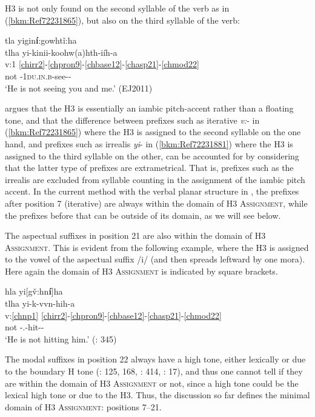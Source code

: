\documentclass[output=paper]{langscibook}
\begin{document}
H3 is not only found on the second syllable of the verb as in (\ref{bkm:Ref72231865}), but also on the third syllable of the verb:

\ea\label{bkm:Ref72231881}tla yigin\textbf{í}:gowhtǐ:ha \\
\glll tlha yi-kinii-koohw(a)hth-iíh-a\\
v:1 \ref{chirr2}-\ref{chpron9}-\ref{chbase12}-\ref{chasp21}-\ref{chmod22}\\ 
not \Irr{}-\textsc{1du.in.b}-see-\Prs{}-\Ind{}\\
\glt `He is not seeing you and me.' (EJ2011)\\
\z 
     
\citet[ch.10]{uchihara2016tone} argues that the H3 is essentially an iambic pitch-accent rather than a floating tone, and that the difference between prefixes such as iterative \textit{v:}{}- in (\ref{bkm:Ref72231865}) where the H3 is assigned to the second syllable on the one hand, and prefixes such as irrealis \textit{yi}{}- in (\ref{bkm:Ref72231881}) where the H3 is assigned to the third syllable on the other, can be accounted for by considering that the latter type of prefixes are extrametrical. That is, prefixes such as the irrealis are excluded from syllable counting in the assignment of the iambic pitch accent. In the current method with the verbal planar structure in , the prefixes after position 7 (iterative) are always within the domain of H3 \textsc{Assignment}, while the prefixes before that can be outside of its domain, as we will see below.

The aspectual suffixes in position 21 are also within the domain of H3 \textsc{Assignment}. This is evident from the following example, where the H3 is assigned to the vowel of the aspectual suffix /i/ (and then spreads leftward by one mora). Here again the domain of H3 \textsc{Assignment} is indicated by square brackets. 

\ea\label{ex:cher:key:19}{hla yi[g\v{v}:hn\textbf{í}]ha} \\ 
\glll tlha   yi-k-vvn-hih-a\\
v:\ref{chnp1} \ref{chirr2}-\ref{chpron9}-\ref{chbase12}-\ref{chasp21}-\ref{chmod22} \\
not \Irr{}-\Third\Sg.\Aarg{}-hit-\Prs{}-\Ind{}\\
\glt `He is not hitting him.' (\citealt{PulteFeeling1975}: 345)
\z 

The modal suffixes in position 22 always have a high tone, either lexically or due to the boundary H tone (\citealt{Lindsey1985}: 125, 168, \citealt{Haag2002}: 414, \citealt{Johnson2005}: 17), and thus one cannot tell if they are within the domain of H3 \textsc{Assignment} or not, since a high tone could be the lexical high tone or due to the H3. Thus, the discussion so far defines the minimal domain of H3 \textsc{Assignment}: positions {7--21}. 
\end{document}
